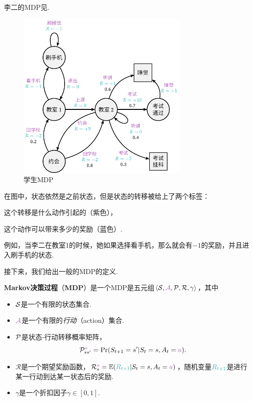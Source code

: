 \begin{example}[李二MDP]
李二的MDP见. 
\begin{figure}[ht]
    \centering
    \includegraphics[width=0.75\textwidth]{figures/Markov-chain/STD.pdf}   
    \caption{学生MDP}
    \label{fig:studentMDP}
\end{figure}
在图中，状态依然是之前状态，但是状态的转移被给上了两个标签：
\begin{enumerate*}[label=(\arabic*)]
    \item 这个转移是什么动作引起的（紫色），
    \item 这个动作可以带来多少的奖励（蓝色）. 
\end{enumerate*}
例如，当李二在教室1的时候，她如果选择看手机，那么就会有$-1$的奖励，并且进入刷手机的状态. 
\end{example}

接下来，我们给出一般的MDP的定义.
\begin{definition}
\textbf{Markov决策过程}（\textbf{MDP}）是一个MDP是五元组$\langle\calS, \light{\mathcal A}, \calP, \mathcal R, \gamma\rangle$，其中
\begin{itemize}
    \item $\mathcal S$是一个有限的状态集合.
    \item $\light{\mathcal A}$是一个有限的\textit{行动}（action）集合.
    \item $\mathcal P$是状态-行动转移概率矩阵，
    \[\calP_{ss'}^{\light{a}} = \Pr(S_{t+1} = s' | S_t = s, A_t = \light{a}).\]
    \item $\mathcal R$是一个期望奖励函数，$\mathcal R_s^{\light{a}} = \E(\contrastlight{R_{t+1}} | S_t = s, A_t = \light{a})$，随机变量$\contrastlight{R_{t+1}}$是进行某一行动到达某一状态后的奖励.
    \item $\gamma$是一个折扣因子$\gamma\in[0,1]$.
\end{itemize}
\end{definition}

